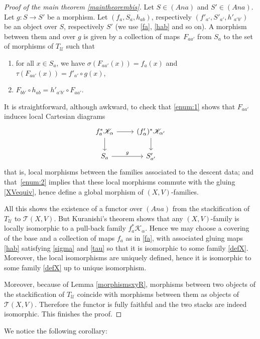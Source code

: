 \documentclass[10pt]{amsart}
\let\mathcal\mathscr
\newcommand{\Ana}{\mathit{Ana}}
\theoremstyle{plain}
\theoremstyle{definition}
\theoremstyle{remark}
\numberwithin{equation}{section}
\begin{document}
\begin{proof}[Proof of the main theorem \ref{maintheorembis}]
Let $S\in(\Ana)$ and $S'\in(\Ana)$. Let $g : S\to S'$ be a morphism. Let $(f_a,S_a, h_{ab})$, respectively $(f'_{a'}, S'_{a'}, h'_{a'b'})$ be an object over $S$, respectively $S'$ (we use \eqref{fa}, \eqref{hab} and so on). A morphism between them and over $g$ is given by a collection of maps~$F_{aa'}$ from $S_a$ to the set of morphisms of $T_{\mathcal U}$ such that
\begin{enumerate}
\item\label{enum:1}
for all $x\in S_a$, we have $\sigma (F_{aa'}(x))=f_a(x)$ and $\tau (F_{aa'}(x))=f'_{a'}\circ g(x)$,
\item\label{enum:2}
$F_{bb'}\circ h_{ab}=h'_{a'b'}\circ F_{aa'}$.
\end{enumerate}
It is straightforward, although awkward, to check that \eqref{enum:1} shows that $F_{aa'}$ induces local Cartesian diagrams
\begin{equation}
\label{XVCD}
\begin{tikzcd}
f_a^*\mathcal K_\alpha \arrow[r]\arrow[d] &(f'_\alpha)^*\mathcal K_{\alpha'}\arrow[d]\\
S_a\arrow[r,"g"] &S'_{a'}
\end{tikzcd}
\end{equation}
that is, local morphisms between the families associated to the descent data; and that~\eqref{enum:2} implies that these local morphisms commute with the gluing \eqref{XVequiv}, hence define a global morphism of $(X,V)$-families.

All this shows the existence of a functor over $(\Ana)$ from the stackification of~$T_{\mathcal U}$ to $\mathcal T(X, V)$. But Kuranishi's theorem shows that any $(X,V)$-family is locally isomorphic to a pull-back family $f_a^*\mathcal K_\alpha$. Hence we may choose a covering of the base and a collection of maps $f_a$ as in \eqref{fa}, with associated gluing maps \eqref{hab} satisfying \eqref{sigma} and \eqref{tau} so that it is isomorphic to some family \eqref{defX}. Moreover, the local isomorphisms are uniquely defined, hence it is isomorphic to some family \eqref{defX} up to unique isomorphism.

Moreover, because of Lemma \ref{morphismsxyR}, morphisms between two objects of the stackification of $T_{\mathcal U}$ coincide with morphisms between them as objects of $\mathcal T(X,V)$. Therefore the functor is fully faithful and the two stacks are indeed isomorphic.
This finishes the proof.
\end{proof}

We notice the following corollary:
\end{document}
